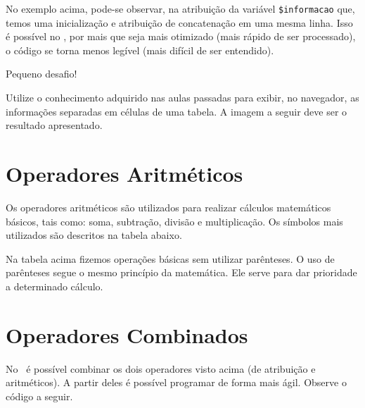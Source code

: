 

No exemplo acima, pode-se observar, na atribuição da variável \texttt{\$informacao} que, 
temos uma inicialização e atribuição de concatenação em uma mesma linha. Isso é possível
no \php, por mais que seja mais otimizado (mais rápido de ser processado), o código se
torna menos legível (mais difícil de ser entendido).

{\Large Pequeno desafio!}

Utilize o conhecimento adquirido nas aulas passadas para exibir, no navegador, as informações
separadas em células de uma tabela. A imagem a seguir deve ser o resultado apresentado. 


\section{Operadores Aritméticos}
\label{operadores-aritmeticos}

Os operadores aritméticos são utilizados para realizar cálculos matemáticos básicos, tais
como: soma, subtração, divisão e multiplicação. Os símbolos mais utilizados são descritos
na tabela abaixo.



Na tabela acima fizemos operações básicas sem utilizar parênteses. O uso de parênteses
segue o mesmo princípio da matemática. Ele serve para dar prioridade a determinado
cálculo.

\section{Operadores Combinados}
\label{operadores-combinados}

No \php~é possível combinar os dois operadores visto acima (de atribuição e aritméticos).
A partir deles é possível programar de forma mais ágil. Observe o código a seguir.

\begin{multicols}{2}

  
  \columnbreak

  

\end{multicols}

